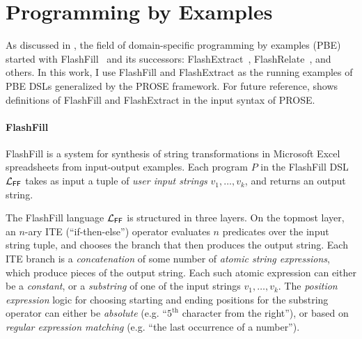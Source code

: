\section{Programming by Examples}
\label{sec:background:pbe}

As discussed in , the field of domain-specific programming by examples (PBE) started with
FlashFill~\cite{flashfill} and its successors: FlashExtract~\cite{flashextract}, FlashRelate~\cite{flashrelate}, and
others.
In this work, I use FlashFill and FlashExtract as the running examples of PBE DSLs generalized by the PROSE framework.
For future reference,  shows definitions of FlashFill and FlashExtract in the input syntax of
PROSE.

\paragraph{FlashFill}
FlashFill is a system for synthesis of string transformations in Microsoft Excel spreadsheets from input-output
examples.
Each program $P$ in the FlashFill DSL $\mathcal{L}_{\mathsf{FF}}$ takes as input a tuple of \emph{user input strings} $v_1, \dots, v_k$,
and returns an output string.

The FlashFill language $\mathcal{L}_{\mathsf{FF}}$ is structured in three layers.
On the topmost layer, an $n$-ary \textsf{ITE} (``if-then-else'') operator evaluates $n$ predicates over the input string
tuple, and chooses the branch that then produces the output string.
Each \textsf{ITE} branch is a \emph{concatenation} of some number of \emph{atomic string expressions}, which
produce pieces of the output string.
Each such atomic expression can either be a \emph{constant}, or a \emph{substring} of one of the input strings $v_1,
\dots, v_k$.
The \emph{position expression} logic for choosing starting and ending positions for the substring operator can either be
\emph{absolute} (e.g.  ``$5^{\text{th}}$ character from the right''), or based on \emph{regular expression matching}
(e.g. ``the last occurrence of a number'').

